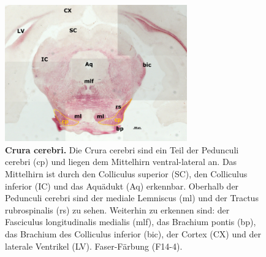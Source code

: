 \begin{figure}[H]
    \centering
    \includegraphics[width=0.7\textwidth]{pictures/Bilder_Laura/cerebral_peduncle_F14_4P_025x.png}
    \caption[Crura cerebri]{\textbf{Crura cerebri.} Die Crura cerebri sind ein Teil der Pedunculi cerebri (cp) und liegen dem Mittelhirn ventral-lateral an. Das Mittelhirn ist durch den Colliculus superior (SC), den Colliculus inferior (IC) und das Aquädukt (Aq) erkennbar. Oberhalb der Pedunculi cerebri sind der mediale Lemniscus (ml) und der Tractus rubrospinalis (rs) zu sehen. Weiterhin zu erkennen sind: der Fasciculus longitudinalis medialis (mlf), das Brachium pontis (bp), das Brachium des Colliculus inferior (bic), der Cortex (CX) und der laterale Ventrikel (LV). Faser-Färbung (F14-4).}
    \label{fig:crura_cerebri}
\end{figure}

